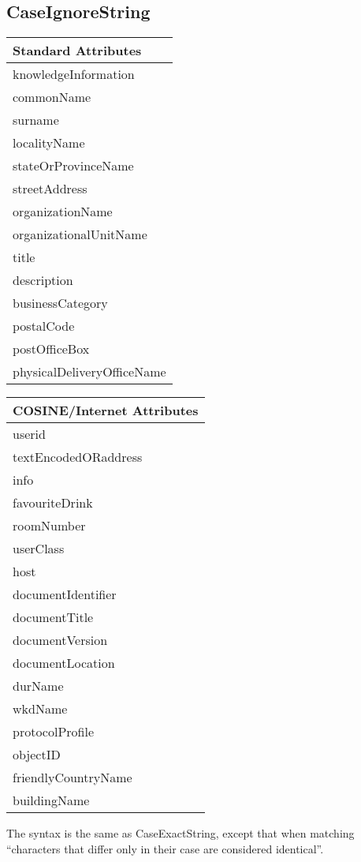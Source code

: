 \subsection{CaseIgnoreString}
\begin{center}\small
\begin{tabular}{|l|}\hline
Standard Attributes \\ \hline
	knowledgeInformation\\
	commonName\\
	surname\\
	localityName\\
	stateOrProvinceName\\
	streetAddress\\
	organizationName\\
	organizationalUnitName\\
	title\\
	description\\
	businessCategory\\
	postalCode\\
	postOfficeBox\\
	physicalDeliveryOfficeName\\
	\hline
\end{tabular}
\begin{tabular}{|l|}\hline
COSINE/Internet Attributes \\ \hline
	userid\\
	textEncodedORaddress\\
	info\\
	favouriteDrink\\
	roomNumber\\
	userClass\\
	host\\
	documentIdentifier\\
	documentTitle\\
	documentVersion\\
	documentLocation\\
	durName\\
	wkdName\\
	protocolProfile\\
	objectID\\
	friendlyCountryName\\
	buildingName\\
\hline
\end{tabular}
\end{center}


The syntax is the same as CaseExactString, except that when matching 
``characters that differ only in their case are considered identical''.

